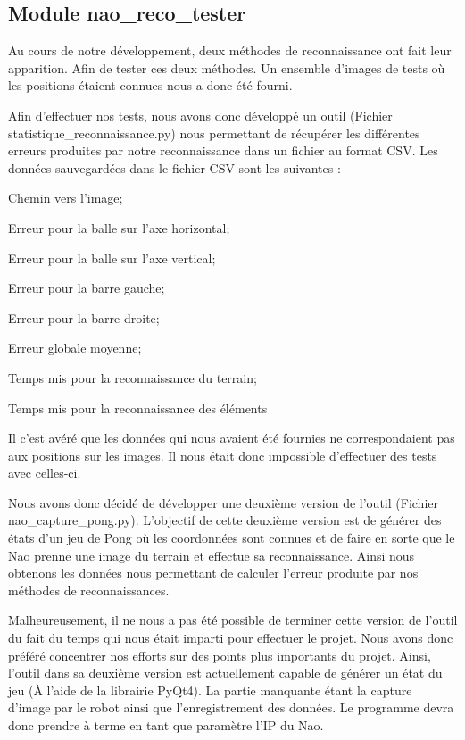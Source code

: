 \subsection{Module nao\_reco\_tester}
\label{sub:Module nao_reco_tester}
\par Au cours de notre développement, deux méthodes de reconnaissance ont fait leur apparition. Afin
de tester ces deux méthodes. Un ensemble d'images de tests où les positions étaient connues nous a donc
été fourni.

\par Afin d'effectuer nos tests, nous avons donc développé un outil (Fichier statistique_reconnaissance.py) 
nous permettant de récupérer les différentes erreurs produites par notre reconnaissance dans un fichier au format 
CSV. Les données sauvegardées dans le fichier CSV sont les suivantes : 

\begin{itemizer}
    \item Chemin vers l'image; 
    \item Erreur pour la balle sur l'axe horizontal; 
    \item Erreur pour la balle sur l'axe vertical;
    \item Erreur pour la barre gauche;
    \item Erreur pour la barre droite;
    \item Erreur globale moyenne;
    \item Temps mis pour la reconnaissance du terrain;
    \item Temps mis pour la reconnaissance des éléments
\end{itemizer}

\par Il c'est avéré que les données qui nous avaient été fournies ne correspondaient pas aux positions sur les images. 
Il nous était donc impossible d'effectuer des tests avec celles-ci.

\par Nous avons donc décidé de développer une deuxième version de l'outil (Fichier nao_capture_pong.py). L'objectif 
de cette deuxième version est de générer des états d'un jeu de Pong où les coordonnées sont connues et de faire en 
sorte que le Nao prenne une image du terrain et effectue sa reconnaissance. Ainsi nous obtenons les données nous 
permettant de calculer l'erreur produite par nos méthodes de reconnaissances.

\par Malheureusement, il ne nous a pas été possible de terminer cette version de l'outil du fait du temps qui nous était 
imparti pour effectuer le projet. Nous avons donc préféré concentrer nos efforts sur des points plus importants du 
projet. Ainsi, l'outil dans sa deuxième version est actuellement capable de générer un état du jeu 
(À l'aide de la librairie PyQt4). 
La partie manquante étant la capture d'image par le robot ainsi que l'enregistrement des données. Le programme devra donc prendre à terme 
en tant que paramètre l'IP du Nao.


